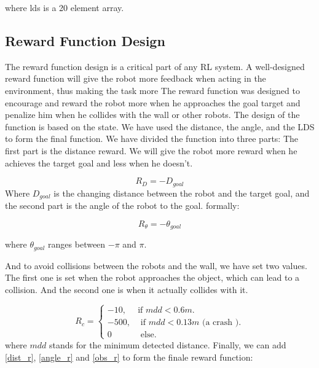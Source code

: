 \documentclass[12pt]{extarticle}
\begin{document}
where lds is a 20 element array.

\subsection{Reward Function Design}

The reward function design is a critical part of any RL system. A well-designed reward function will give the robot more feedback when acting in the environment, thus making the task more 
The reward function was designed to encourage and reward the robot more when he approaches the goal target and penalize him when he collides with the wall or other robots.
The design of the function is based on the state. We have used the distance, the angle, and the LDS to form the final function.
We have divided the function into three parts: The first part is the distance reward. We will give the robot more reward when he achieves the target goal and less when he doesn't.
   
\setcounter{equation}{0}

       \begin{equation} \label{dist_r}
     R_{D}=-D_{goal}
   \end{equation}
 Where $D_{goal}$ is the changing distance between the robot and the target goal, and the second part is the angle of the robot to the goal. formally:


     \begin{equation} \label{angle_r}
     R_{\theta}=-\theta_{goal}
   \end{equation}
 
 where $\theta_{goal}$  ranges  between $-\pi$  and $\pi$.
 
And to avoid collisions between the robots and the wall, we have set two values. The first one is set when the robot approaches the object, which can lead to a collision. And the second one is when it actually collides with it.


\begin{equation}  \label{obs_r}
  R_{c}=\begin{cases}
    -10, & \text{if $mdd< 0.6m$}.\\
    -500 , & \text{ if $mdd <0.13m$ (a crash )}.\\
    0 & \text{ else}.
  \end{cases}
\end{equation}
where $mdd$ stands for the minimum detected distance.\linebreak
Finally, we can add \ref{dist_r}, \ref{angle_r} and \ref{obs_r} to form the finale reward function: 
\end{document}
